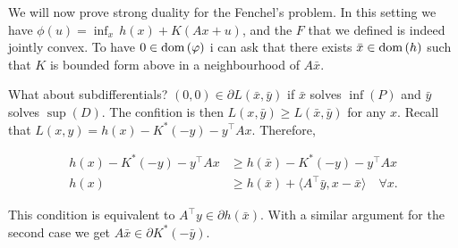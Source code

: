 We will now prove strong duality for the Fenchel's problem. In this setting we have $\phi(u) = \inf_x \, h(x) + K(Ax+u)$, and the $F$ that we defined is indeed jointly convex. To have $0 \in \mathrm{dom}\left(\varphi\right)$ i can ask that there exists $\bar{x} \in \mathrm{dom}\left(h\right)$ such that $K$ is bounded form above in a neighbourhood of $A\bar{x}$. 

What about subdifferentials? $(0,0) \in \partial L(\bar{x},\bar{y})$ if $\bar{x}$ solves $\inf(P)$ and $\bar{y}$ solves $\sup(D)$. The confition is then $L(x,\bar{y}) \ge L(\bar{x},\bar{y})$ for any $x$. Recall that $L(x,y) = h(x) - K^*(-y) - y^\top A x$. Therefore, 

\begin{align*}
    h(x) - K^*(-y) - y^\top A x &\ge h(\bar{x}) - K^*(-y) - y^\top A x \\
    h(x) &\ge h(\bar{x}) + \langle A^\top \bar{y}, x - \bar{x} \rangle \quad \forall x.
\end{align*}

This condition is equivalent to $A^\top y \in \partial h(\bar{x})$. With a similar argument for the second case we get $A\bar{x} \in \partial K^*(-\bar{y})$. 




